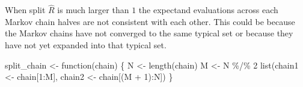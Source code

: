 \documentclass[
  letterpaper,
  DIV=11,
  numbers=noendperiod]{scrartcl}
\newenvironment{Shaded}{\begin{snugshade}}{\end{snugshade}}
\newcommand{\ControlFlowTok}[1]{\textcolor[rgb]{0.00,0.23,0.31}{#1}}
\newcommand{\DecValTok}[1]{\textcolor[rgb]{0.68,0.00,0.00}{#1}}
\newcommand{\FunctionTok}[1]{\textcolor[rgb]{0.28,0.35,0.67}{#1}}
\newcommand{\NormalTok}[1]{\textcolor[rgb]{0.00,0.23,0.31}{#1}}
\newcommand{\OtherTok}[1]{\textcolor[rgb]{0.00,0.23,0.31}{#1}}
\newcommand{\SpecialCharTok}[1]{\textcolor[rgb]{0.37,0.37,0.37}{#1}}
\begin{document}
When split \(\hat{R}\) is much larger than \(1\) the expectand
evaluations across each Markov chain halves are not consistent with each
other. This could be because the Markov chains have not converged to the
same typical set or because they have not yet expanded into that typical
set.

\begin{Shaded}
\begin{Highlighting}[]
\NormalTok{split\_chain }\OtherTok{\textless{}{-}} \ControlFlowTok{function}\NormalTok{(chain) \{}
\NormalTok{  N }\OtherTok{\textless{}{-}} \FunctionTok{length}\NormalTok{(chain)}
\NormalTok{  M }\OtherTok{\textless{}{-}}\NormalTok{ N }\SpecialCharTok{\%/\%} \DecValTok{2}
  \FunctionTok{list}\NormalTok{(chain1 }\OtherTok{\textless{}{-}}\NormalTok{ chain[}\DecValTok{1}\SpecialCharTok{:}\NormalTok{M], chain2 }\OtherTok{\textless{}{-}}\NormalTok{ chain[(M }\SpecialCharTok{+} \DecValTok{1}\NormalTok{)}\SpecialCharTok{:}\NormalTok{N])}
\NormalTok{\}}
\end{Highlighting}
\end{Shaded}
\end{document}

